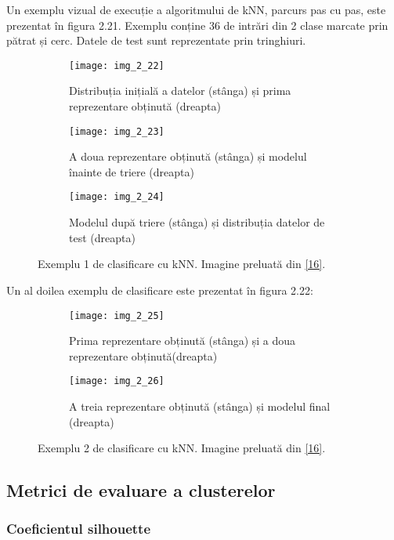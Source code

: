 Un exemplu vizual de execuție a algoritmului de kNN, parcurs pas cu pas, este prezentat în figura 2.21. Exemplu conține 36 de intrări din 2 clase marcate prin pătrat și cerc. Datele de test sunt reprezentate prin tringhiuri.
\begin{figure}[!tbp]
  \begin{subfigure}[b]{0.4\textwidth}
    \texttt{[image: img\_2\_22]}
    \caption{Distribuția inițială a datelor (stânga) și prima reprezentare obținută (dreapta)}
    \label{fig:f1}
  \end{subfigure}
  \hfill
  \begin{subfigure}[b]{0.4\textwidth}
    \texttt{[image: img\_2\_23]}
    \caption{A doua reprezentare obținută (stânga) și modelul înainte de triere (dreapta)}
    \label{fig:f2}
  \end{subfigure}
  \hfill
  \begin{subfigure}[b]{0.4\textwidth}
    \texttt{[image: img\_2\_24]}
    \caption{Modelul după triere (stânga) și distribuția datelor de test (dreapta)}
    \label{fig:f3}
  \end{subfigure}
  \caption[Exemplu 1 de clasificare cu kNN]{Exemplu 1 de clasificare cu kNN. Imagine preluată din \hyperlink{gongdeguo}{[16]}.}
\end{figure}  

Un al doilea exemplu de clasificare este prezentat în figura 2.22:
\begin{figure}[!tbp]
  \begin{subfigure}[b]{0.4\textwidth}
    \texttt{[image: img\_2\_25]}
    \caption{Prima reprezentare obținută (stânga) și a doua reprezentare obținută(dreapta)}
    \label{fig:f1}
  \end{subfigure}
  \hfill
  \begin{subfigure}[b]{0.4\textwidth}
    \texttt{[image: img\_2\_26]}
    \caption{A treia reprezentare obținută (stânga) și modelul final (dreapta)}
    \label{fig:f2}
  \end{subfigure}
  \caption[Exemplu 2 de clasificare cu kNN]{Exemplu 2 de clasificare cu kNN. Imagine preluată din \hyperlink{gongdeguo}{[16]}.}
\end{figure}

\subsection{Metrici de evaluare a clusterelor}

\subsubsection{Coeficientul silhouette}

